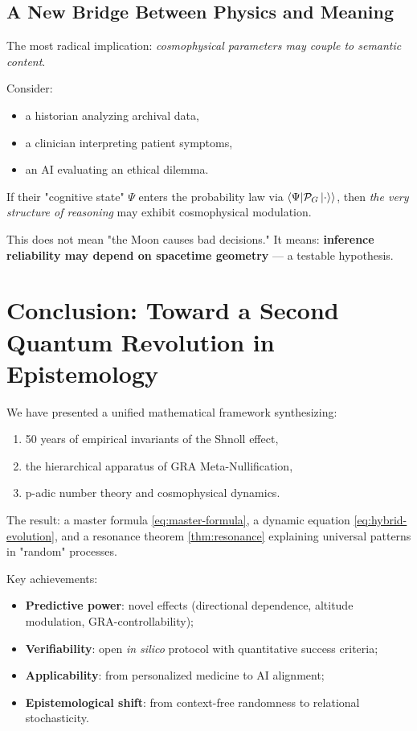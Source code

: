 \documentclass[12pt,a4paper]{article}
\theoremstyle{plain}
\theoremstyle{definition}
\theoremstyle{remark}
\newcommand{\cP}{\mathcal{P}}
\newcommand{\inner}[2]{\left\langle #1 \middle| #2 \right\rangle}
\begin{document}
\subsection{A New Bridge Between Physics and Meaning}
The most radical implication: \emph{cosmophysical parameters may couple to semantic content}.

Consider:
\begin{itemize}
    \item a historian analyzing archival data,
    \item a clinician interpreting patient symptoms,
    \item an AI evaluating an ethical dilemma.
\end{itemize}
If their "cognitive state" $\Psi$ enters the probability law via $\inner{\Psi}{\cP_G \ket{\cdot}}$, then \emph{the very structure of reasoning} may exhibit cosmophysical modulation.

This does not mean "the Moon causes bad decisions." It means: \textbf{inference reliability may depend on spacetime geometry} --- a testable hypothesis.

\section{Conclusion: Toward a Second Quantum Revolution in Epistemology}
\label{sec:conclusion}

We have presented a unified mathematical framework synthesizing:
\begin{enumerate}
    \item 50 years of empirical invariants of the Shnoll effect,
    \item the hierarchical apparatus of GRA Meta-Nullification,
    \item p-adic number theory and cosmophysical dynamics.
\end{enumerate}

The result: a master formula \eqref{eq:master-formula}, a dynamic equation \eqref{eq:hybrid-evolution}, and a resonance theorem \ref{thm:resonance} explaining universal patterns in "random" processes.

Key achievements:
\begin{itemize}
    \item \textbf{Predictive power}: novel effects (directional dependence, altitude modulation, GRA-controllability);
    \item \textbf{Verifiability}: open \textit{in silico} protocol with quantitative success criteria;
    \item \textbf{Applicability}: from personalized medicine to AI alignment;
    \item \textbf{Epistemological shift}: from context-free randomness to relational stochasticity.
\end{itemize}
\end{document}
